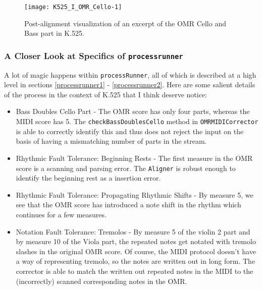 \begin{figure}[H]
\centering
\texttt{[image: K525\_I\_OMR\_Cello-1]}
\caption{Post-alignment visualization of an excerpt of the OMR Cello and Bass part in K.525.}
\end{figure}

\subsubsection{A Closer Look at Specifics of \texttt{processrunner}}
A lot of magic happens within \texttt{processRunner}, all of which is described at a high level in sections \ref{processrunner1} - \ref{processrunner2}. Here are some salient details of the process in the context of K.525 that I think deserve notice:
\begin{itemize}
\item Bass Doubles Cello Part - The OMR score has only four parts, whereas the MIDI score has 5. The \texttt{checkBassDoublesCello} method in \texttt{OMRMIDICorrector} is able to correctly identify this and thus does not reject the input on the basis of having a mismatching number of parts in the stream. 
\item Rhythmic Fault Tolerance: Beginning Rests - The first measure in the OMR score is a scanning and parsing error. The \texttt{Aligner} is robust enough to identify the beginning rest as a insertion error. 
\item Rhythmic Fault Tolerance: Propagating Rhythmic Shifts - By measure 5, we see that the OMR score has introduced a  note shift in the rhythm which continues for a few measures. 
\item Notation Fault Tolerance: Tremolos - By measure 5 of the violin 2 part and by measure 10 of the Viola part, the repeated  notes get notated with tremolo slashes in the original OMR score. Of course, the MIDI protocol doesn't have a way of representing tremolo, so the notes are written out in long form. The corrector is able to match the written out repeated notes in the MIDI to the (incorrectly) scanned corresponding notes in the OMR. 
\end{itemize}

